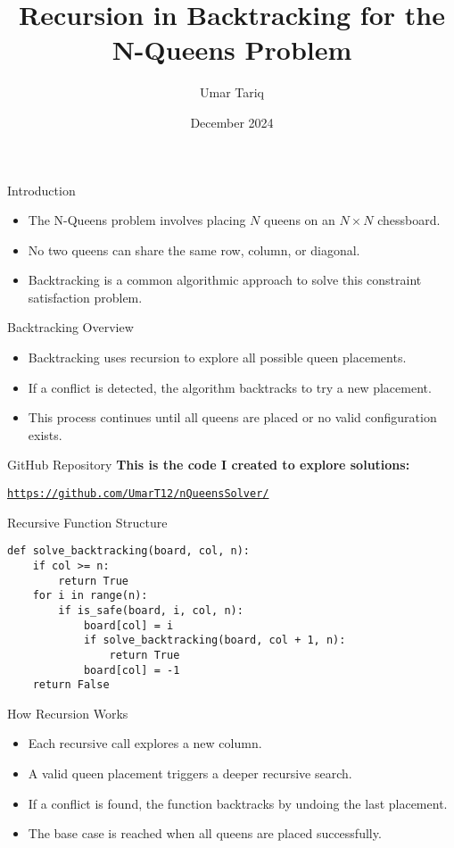 \documentclass{beamer}
\title{Recursion in Backtracking for the N-Queens Problem}
\author{Umar Tariq}
\date{December 2024}
\begin{document}
\frame{\titlepage}

\begin{frame}{Introduction}
\begin{itemize}
    \item The N-Queens problem involves placing $N$ queens on an $N \times N$ chessboard.
    \item No two queens can share the same row, column, or diagonal.
    \item Backtracking is a common algorithmic approach to solve this constraint satisfaction problem.
\end{itemize}
\end{frame}

\begin{frame}{Backtracking Overview}
\begin{itemize}
    \item Backtracking uses recursion to explore all possible queen placements.
    \item If a conflict is detected, the algorithm backtracks to try a new placement.
    \item This process continues until all queens are placed or no valid configuration exists.
\end{itemize}
\end{frame}

\begin{frame}{GitHub Repository}
\textbf{This is the code I created to explore solutions:}
\begin{center}
\href{https://github.com/UmarT12/nQueensSolver/}{\texttt{https://github.com/UmarT12/nQueensSolver/}}
\end{center}
\end{frame}

\begin{frame}[fragile]{Recursive Function Structure}
\begin{lstlisting}
def solve_backtracking(board, col, n):
    if col >= n:
        return True
    for i in range(n):
        if is_safe(board, i, col, n):
            board[col] = i
            if solve_backtracking(board, col + 1, n):
                return True
            board[col] = -1
    return False
\end{lstlisting}
\end{frame}

\begin{frame}{How Recursion Works}
\begin{itemize}
    \item Each recursive call explores a new column.
    \item A valid queen placement triggers a deeper recursive search.
    \item If a conflict is found, the function backtracks by undoing the last placement.
    \item The base case is reached when all queens are placed successfully.
\end{itemize}
\end{frame}
\end{document}
